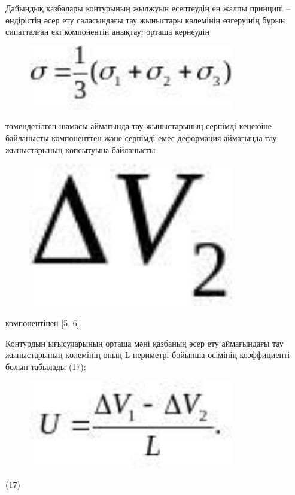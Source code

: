 Дайындық қазбалары контурының жылжуын есептеудің ең жалпы принципі --
өндірістің әсер ету саласындағы тау жыныстары көлемінің өзгеруінің бұрын
сипатталған екі компонентін анықтау: орташа кернеудің
\begin{figure}[H]
	\centering
	\includegraphics[width=0.8\textwidth]{assets/1315}
	\caption*{}
\end{figure} төмендетілген шамасы аймағында тау
жыныстарының серпімді кеңеюіне байланысты компоненттен және серпімді
емес деформация аймағында тау жыныстарының қопсытуына байланысты
\begin{figure}[H]
	\centering
	\includegraphics[width=0.8\textwidth]{assets/1316}
	\caption*{}
\end{figure} компонентінен {[}5, 6{]}.

Контурдың ығысуларының орташа мәні қазбаның әсер ету аймағындағы тау
жыныстарының көлемінің оның L периметрі бойынша өсімінің коэффициенті
болып табылады (17):

\begin{figure}[H]
	\centering
	\includegraphics[width=0.8\textwidth]{assets/1317}
	\caption*{}
\end{figure} (17)

